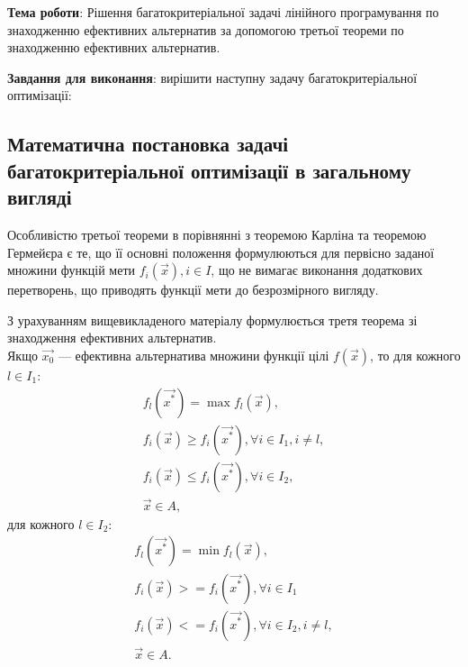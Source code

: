 


\newcommand{\labnumber}{3} %



\usepackage{systeme}
\usepackage{longtable,tabu}
\usepackage{multirow}
\usepackage{array,multirow}
\usepackage{pdflscape}
\usepackage{afterpage}
\usepackage{bm}

\graphicspath{{../figures/}}


\Ukrainian


\addtocounter{page}{1}

\textbf{Тема роботи}: Рішення багатокритеріальної задачі лінійного програмування по знаходженню ефективних альтернатив за допомогою третьої теореми по знаходженню ефективних альтернатив.

\textbf{Завдання для виконання}: вирішити наступну задачу багатокритеріальної оптимізації:


\subsection{Математична постановка задачі багатокритеріальної оптимізації в загальному вигляді}
Особливістю третьої теореми в порівнянні з теоремою Карліна та теоремою Гермейєра є те, що її основні положення формулюються для первісно заданої множини функцій мети ${f_i(\vec{x}), i \in I}$, що не вимагає виконання додаткових перетворень, що приводять функції мети до безрозмірного вигляду. 

З урахуванням вищевикладеного матеріалу формулюється третя теорема зі знаходження ефективних альтернатив. \\[7em]

Якщо $\vec{x_0}$ --- ефективна альтернатива множини функції цілі $f(\vec{x})$, то для кожного $l \in I_1$:
\begin{gather*} 
    f_l (\vec{x^*}) = \max {f_l(\vec{x})}, \\
    f_i (\vec{x}) \geq f_i(\vec{x^*}), \forall i \in I_1, i \not = l, \\
    f_i (\vec{x}) \leq f_i(\vec{x^*}), \forall i \in I_2, \\
    \vec{x} \in A,
\end{gather*}
для кожного $l \in I_2$:
\begin{gather*} 
    f_l (\vec{x^*}) = \min{f_l(\vec{x})}, \\
    f_i (\vec{x}) >= f_i(\vec{x^*}), \forall i \in I_1 \\
    f_i (\vec{x}) <= f_i(\vec{x^*}), \forall i \in I_2, i \not = l, \\
    \vec{x} \in A.
\end{gather*}

